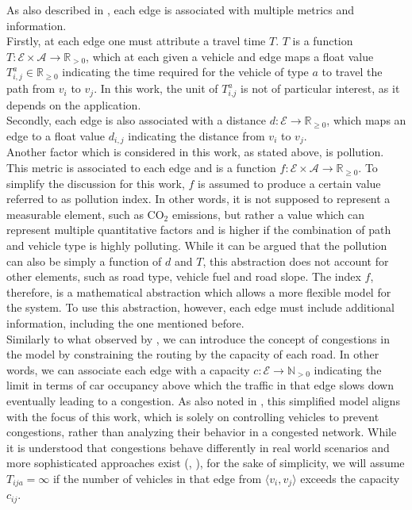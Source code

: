 As also described in \cite{project_thesis}, each edge is associated with multiple metrics and information. \\
Firstly, at each edge one must attribute a travel time $T$. $T$ is a function $T: \mathcal{E} \times \mathcal{A} \rightarrow \mathbb{R}_{> 0}$, which at each given a vehicle and edge maps a float value $T_{i,j}^a \in \mathbb{R}_{\geq 0}$ indicating the time required for the vehicle of type $a$ to travel the path from $v_i$ to $v_j$. In this work, the unit of $T_{i.j}^a$ is not of particular interest, as it depends on the application. \\
Secondly, each edge is also associated with a distance $d: \mathcal{E} \rightarrow \mathbb{R}_{\geq 0}$, which maps an edge to a float value $d_{i,j}$ indicating the distance from $v_i$ to $v_j$. \\
Another factor which is considered in this work, as stated above, is pollution. This metric is associated to each edge and is a function 
$f: \mathcal{E} \times \mathcal{A} \rightarrow \mathbb{R}_{\geq 0}$. To simplify the discussion for this work, $f$ is assumed to produce a certain value referred to as pollution index. In other words, it is not supposed to represent a measurable element, such as $\text{CO}_2$ emissions, but rather a value which can represent multiple quantitative factors and is higher if the combination of path and vehicle type is highly polluting. While it can be argued that the pollution can also be simply a function of $d$ and $T$, this abstraction does not account for other elements, such as road type, vehicle fuel and road slope. The index $f$, therefore, is a mathematical abstraction which allows a more flexible model for the system. To use this abstraction, however, each edge must include additional information, including the one mentioned before. \\
Similarly to what observed by , we can introduce the concept of congestions in the model by constraining the routing by the capacity of each road. In other words, we can associate each edge with a capacity $c: \mathcal{E} \rightarrow \mathbb{N}_{> 0}$ indicating the limit in terms of car occupancy above which the traffic in that edge slows down eventually leading to a congestion. As also noted in \cite{congestion_vrp_phd_graph}, this simplified model aligns with the focus of this work, which is solely on controlling vehicles to prevent congestions, rather than analyzing their behavior in a congested network. While it is understood that congestions behave differently in real world scenarios and more sophisticated approaches exist (\cite{lindsey1999congestion}, \cite{verhoef1999time}), for the sake of simplicity, we will assume $T_{ija} = \infty $ if the number of vehicles in that edge from $\langle v_i, v_j \rangle$ exceeds the capacity $c_{ij}$.\\
